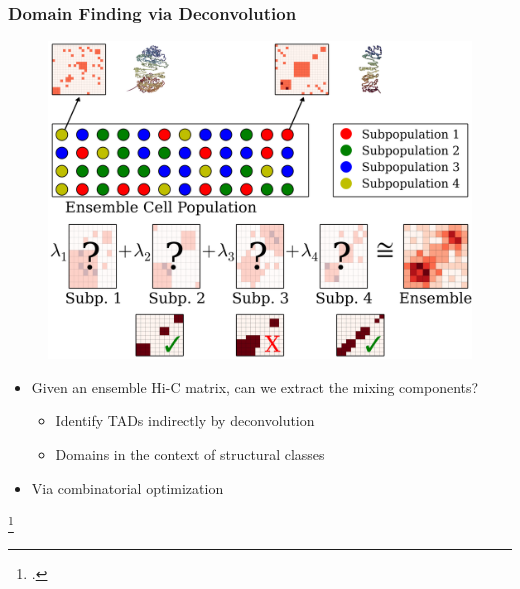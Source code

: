 \documentclass[12pt]{beamer}
\begin{document}
\begin{frame}
\frametitle{Domain Finding via Deconvolution}

\begin{figure}
\includegraphics[scale=0.25]{decon_ex.png}
\end{figure}

\begin{itemize}
\item Given an ensemble Hi-C matrix, can we extract the mixing
  components?
\begin{itemize}
\item Identify TADs indirectly by deconvolution
\vspace{0.05cm}
\item Domains in the context of structural classes
\end{itemize}
\vspace{0.1cm}
\item Via combinatorial optimization
\end{itemize}

\footcitetext{decon2015}

\end{frame}
\end{document}
